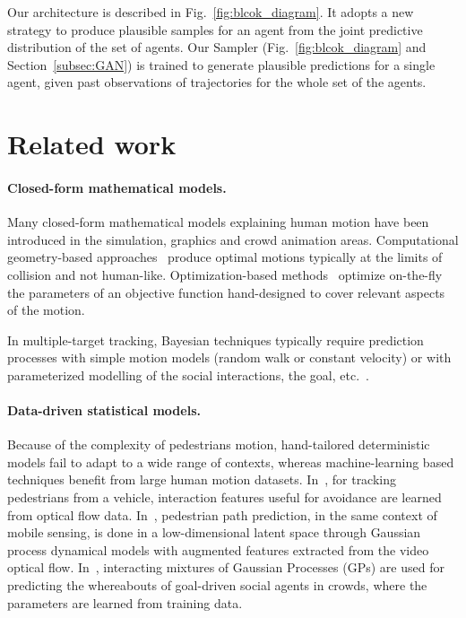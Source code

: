 \documentclass[10pt,twocolumn,letterpaper]{article}
\begin{document}
Our architecture is described in Fig.~\ref{fig:blcok_diagram}. It adopts a new strategy to produce plausible samples for an agent from the joint predictive distribution of the set of agents. Our Sampler (Fig.~\ref{fig:blcok_diagram} and Section~\ref{subsec:GAN}) is trained to generate plausible predictions for a single agent, given past observations of trajectories for the whole set of the agents.


\section{Related work}
\label{sec:related}

\paragraph{Closed-form mathematical models.} Many closed-form mathematical models explaining human motion have been introduced in the simulation, graphics and crowd animation areas. Computational geometry-based approaches~\cite{RVO2011} produce optimal motions typically at the limits of collision and not human-like. Optimization-based methods~\cite{Yamaguchi2011} optimize on-the-fly the parameters of an objective function hand-designed to cover relevant aspects of the motion.

In multiple-target tracking, Bayesian techniques typically require prediction processes with simple motion models (random walk or constant velocity) or with parameterized modelling of the social interactions, the goal, etc.~\cite{Pellegrini2009}.

\vspace{-0.4cm}
\paragraph{Data-driven statistical models.} Because of the complexity of pedestrians motion, hand-tailored deterministic models fail to adapt to a wide range of contexts, whereas machine-learning based techniques benefit from large human motion datasets. In~\cite{Leal2014}, for tracking pedestrians from a vehicle, interaction features useful for avoidance are learned from optical flow data. In~\cite{Keller2014}, pedestrian path prediction, in the same context of mobile sensing, is done in a low-dimensional latent space through Gaussian process dynamical models with augmented features extracted from the video optical flow. In~\cite{Trautman2015}, interacting mixtures of Gaussian Processes (GPs) are used for predicting the whereabouts of goal-driven social agents in crowds, where the parameters are learned from training data.  
\end{document}
